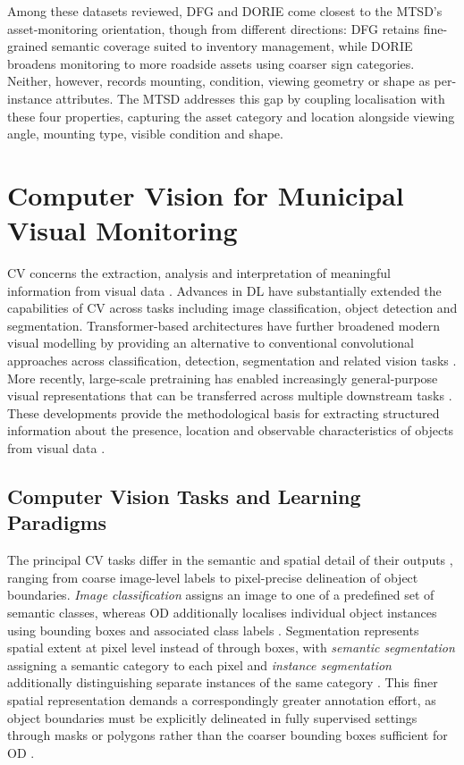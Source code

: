\noindent Among these datasets reviewed, DFG and DORIE come closest to the \gls{MTSD}'s asset-monitoring orientation, though from different directions: DFG retains fine-grained semantic coverage suited to inventory management, while DORIE broadens monitoring to more roadside assets using coarser sign categories. Neither, however, records mounting, condition, viewing geometry or shape as per-instance attributes. The \gls{MTSD} addresses this gap by coupling localisation with these four properties, capturing the asset category and location alongside viewing angle, mounting type, visible condition and shape.

\section{Computer Vision for Municipal Visual Monitoring}
\label{sec:bg-cv}
\gls{CV} concerns the extraction, analysis and interpretation of meaningful information from visual data \cite{reshadi2026deeplearningcv}. Advances in \gls{DL} have substantially extended the capabilities of \gls{CV} across tasks including image classification, object detection and segmentation. Transformer-based architectures have further broadened modern visual modelling by providing an alternative to conventional convolutional approaches across classification, detection, segmentation and related vision tasks \cite{Transformers4Vision}. More recently, large-scale pretraining has enabled increasingly general-purpose visual representations that can be transferred across multiple downstream tasks \cite{reshadi2026deeplearningcv}. These developments provide the methodological basis for extracting structured information about the presence, location and observable characteristics of objects from visual data \cite{BG33-object-detection,BG34-semantic-segmentation,BG41-visual-attributes}.

\subsection{Computer Vision Tasks and Learning Paradigms}
\label{sec:bg-cv-paradigms}
The principal \gls{CV} tasks differ in the semantic and spatial detail of their outputs \cite{reshadi2026deeplearningcv,Transformers4Vision}, ranging from coarse image-level labels to pixel-precise delineation of object boundaries. \emph{Image classification} assigns an image to one of a predefined set of semantic classes, whereas \gls{OD} additionally localises individual object instances using bounding boxes and associated class labels \cite{BG32-image-classification,BG33-object-detection,zhu2024openvocabulary}. Segmentation represents spatial extent at pixel level instead of through boxes, with \emph{semantic segmentation} assigning a semantic category to each pixel and \emph{instance segmentation} additionally distinguishing separate instances of the same category \cite{BG34-semantic-segmentation,BG35-instance-segmentation,zhu2024openvocabulary}. This finer spatial representation demands a correspondingly greater annotation effort, as object boundaries must be explicitly delineated in fully supervised settings through masks or polygons rather than the coarser bounding boxes sufficient for \gls{OD} \cite{BG36-mask-annotation}.

